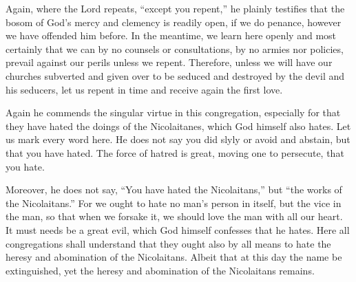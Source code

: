 Again, where the Lord repeats, “except you repent,” he plainly testifies that the bosom of God’s mercy and clemency is readily open, if we do penance, however we have offended him before. In the meantime, we learn here openly and most certainly that we can by no counsels or consultations, by no armies nor policies, prevail against our perils unless we repent. Therefore, unless we will have our churches subverted and given over to be seduced and destroyed by the devil and his seducers, let us repent in time and receive again the first love.

Again he commends the singular virtue in this congregation, especially for that they have hated the doings of the Nicolaitanes, which God himself also hates. Let us mark every word here. He does not say you did slyly or avoid and abstain, but that you have hated. The force of hatred is great, moving one to persecute, that you hate.

Moreover, he does not say, “You have hated the Nicolaitans,” but “the works of the Nicolaitans.” For we ought to hate no man’s person in itself, but the vice in the man, so that when we forsake it, we should love the man with all our heart. It must needs be a great evil, which God himself confesses that he hates. Here all congregations shall understand that they ought also by all means to hate the heresy and abomination of the Nicolaitans. Albeit that at this day the name be extinguished, yet the heresy and abomination of the Nicolaitans remains.

